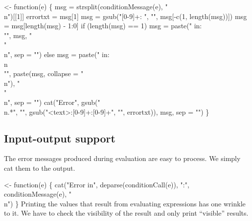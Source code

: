 \documentclass[a4paper]{article}%
\begin{document}
\nwenddocs{}\plusendmoddef\nwstartdeflinemarkup{}\nwenddeflinemarkup
{} <- function(e) \{
    msg = strsplit(conditionMessage(e), "\\n")[[1]]
    errortxt = msg[1]
    msg = gsub("[0-9]+: ", "", msg[-c(1, length(msg))])
    msg = msg[length(msg) - 1:0]
    if (length(msg) == 1)
        msg = paste(" in: \\"", msg, "\\"\\n", sep = "")
    else
        msg = paste(" in:\\n\\"",
                    paste(msg, collapse = "\\n"),
                    "\\"\\n", sep = "")
    cat("Error",
        gsub("\\n.*", "",
             gsub("<text>:[0-9]+:[0-9]+", "",
                  errortxt)),
        msg, sep = "")
\}
\eatline
{}\nwendcode{}\nwdocspar
\subsection{Input-output support}
\label{sec:input-output-support}

The error messages produced during evaluation are easy to process.  We
simply cat them to the output.

\nwenddocs{}\plusendmoddef\nwstartdeflinemarkup{}\nwenddeflinemarkup
{} <- function(e) \{
    cat("Error in", deparse(conditionCall(e)),
        ":", conditionMessage(e), "\\n")
\}
\eatline
{}\nwendcode{}\nwdocspar
Printing the values that result from evaluating expressions has one
wrinkle to it.  We have to check the visibility of the result and only
print ``visible'' results.
\end{document}
